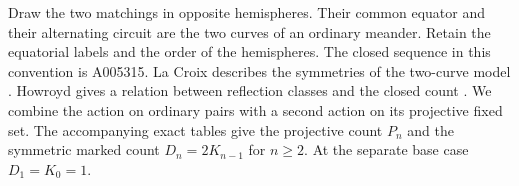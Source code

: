 

\begin{abstract}
Let \(M_n\) be the number of ordered pairs of noncrossing matchings on \(2n\) cyclically labelled sites whose union is connected. Two finite group actions determine a residue modulo \(8n\) at odd orders where the smaller fixed sets can be counted. In particular, \(M_{39}\equiv16\pmod{312}\). We give two ways to determine the projective term modulo eight, one by enumerating self-dual diagrams. The latter also characterizes exactly the odd orders admitting a projective word whose square reverses both curves.
\end{abstract}
Draw the two matchings in opposite hemispheres. Their common equator and their alternating circuit are the two curves of an ordinary meander. Retain the equatorial labels and the order of the hemispheres. The closed sequence in this convention is A005315. La Croix describes the symmetries of the two-curve model \cite{lacroix}. Howroyd gives a relation between reflection classes and the closed count \cite{how}. We combine the action on ordinary pairs with a second action on its projective fixed set. The accompanying exact tables give the projective count \(P_n\) and the symmetric marked count \(D_n=2K_{n-1}\) for \(n\ge2\). At the separate base case \(D_1=K_0=1\).


